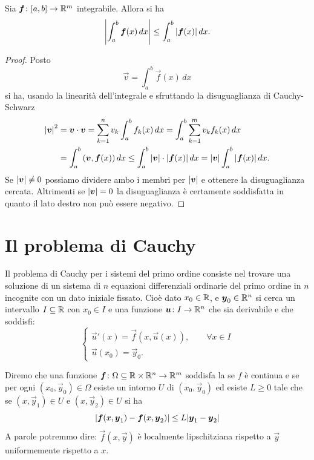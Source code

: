 \begin{theorem}\label{teo:tipo_jensen}
\mymark{*}
Sia $\boldsymbol f\colon [a,b]\to \mathbb R^m$ integrabile. Allora si ha
\[
  {\left|\int_a^b \boldsymbol f(x)\, dx\right|} \le \int_a^b {\left|\boldsymbol f(x)\right|}\, dx.
\]
\end{theorem}
%
\begin{proof}
Posto
\[
 \vec v = \int_a^b \vec f(x)\, dx
\]
si ha, usando la linearità dell'integrale
e sfruttando la disuguaglianza di Cauchy-Schwarz
\begin{align*}
  {\left|\boldsymbol v\right|}^2
  &= \boldsymbol v \cdot \boldsymbol v
   = \sum_{k=1}^n v_k \int_a^b f_k(x)\, dx
   = \int_a^b \sum_{k=1}^m v_k f_k(x)\, dx \\
  &= \int_a^b {\left( \boldsymbol v, \boldsymbol f(x) \right)}\, dx
  \le \int_a^b {\left|\boldsymbol v\right|}\cdot {\left|\boldsymbol f(x)\right|}\, dx
  = {\left|\boldsymbol v\right|} \int_a^b {\left|\boldsymbol f(x)\right|}\, dx.
\end{align*}
Se ${\left|\boldsymbol v\right|}\neq 0$ possiamo dividere ambo i membri per ${\left|\boldsymbol v\right|}$ e
ottenere la disuguaglianza cercata.
Altrimenti se ${\left|\boldsymbol v\right|}=0$ la disuguaglianza è certamente soddisfatta in
quanto il lato destro non può essere negativo.
\end{proof}


\section{Il problema di Cauchy}

Il problema di Cauchy
per i sistemi del primo ordine
consiste nel
trovare una soluzione di un sistema di $n$ equazioni differenziali ordinarie del primo ordine in $n$ incognite
con un dato iniziale fissato. Cioè dato $x_0\in \mathbb R$,
e $\boldsymbol y_0 \in \mathbb R^n$ si cerca un intervallo $I\subseteq \mathbb R$ con $x_0\in I$ e una funzione $\boldsymbol u \colon I\to \mathbb R^n$
che sia derivabile e che soddisfi:
\begin{equation}\label{eq:problema_cauchy}
\begin{cases}
 \vec u'(x) = \vec f(x, \vec u(x)), \qquad \forall x\in I\\
 \vec u(x_0) = \vec y_0.
\end{cases}
\end{equation}

\begin{definition}
\label{def:cauchy_lipschitz}
Diremo che una funzione $\boldsymbol f\colon \Omega\subseteq \mathbb R\times \mathbb R^n \to \mathbb R^m$
soddisfa la  se $f$ è continua e se
per ogni $(x_0,\vec y_0)\in \Omega$ esiste un intorno $U$ di $(x_0,\vec y_0)$
ed esiste $L\ge 0$
tale che se $(x,\vec y_1)\in U$ e $(x,\vec y_2)\in U$ si ha
\[
  {\left|\boldsymbol f(x,\boldsymbol y_1)- \boldsymbol f(x,\boldsymbol y_2)\right|} \le L {\left|\boldsymbol y_1- \boldsymbol y_2\right|}
\]
A parole potremmo dire: $\vec f(x,\vec y)$ è localmente lipschitziana rispetto
a $\vec y$ uniformemente
rispetto a $x$.
\end{definition}

